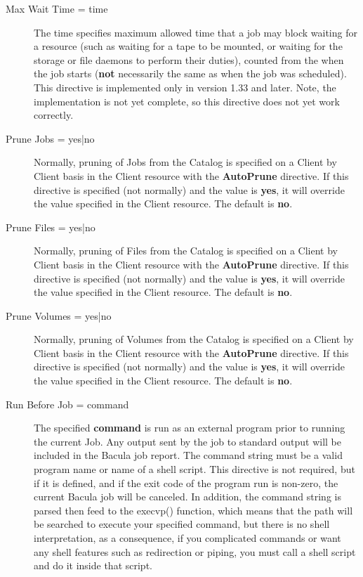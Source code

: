\begin{description}
\item [Max Wait Time = \lt{}time\gt{}]
   The time specifies  maximum allowed time that a job may block waiting for a
   resource  (such as waiting for a tape to be mounted, or waiting for the
   storage  or file daemons to perform their duties), counted from the when  the
   job starts ({\bf not} necessarily the same as when the job  was scheduled).
   This directive is implemented only in version 1.33  and later. Note, the
   implementation is not yet complete, so  this directive does not yet work
   correctly. 

\item [Prune Jobs = \lt{}yes|no\gt{}]
   Normally, pruning of Jobs  from the Catalog is specified on a Client by Client
   basis in the  Client resource with the {\bf AutoPrune} directive. If this 
   directive is specified (not normally) and the value is {\bf yes}, it  will
   override the value specified in the Client resource.  The default is {\bf no}.


\item [Prune Files = \lt{}yes|no\gt{}]
   Normally, pruning of Files  from the Catalog is specified on a Client by
Client basis in the  Client resource with the {\bf AutoPrune} directive. If
this  directive is specified (not normally) and the value is {\bf yes}, it 
will override the value specified in the Client resource.  The default is {\bf
no}. 

\item [Prune Volumes = \lt{}yes|no\gt{}]
   Normally, pruning of Volumes  from the Catalog is specified on a Client by
   Client basis in the  Client resource with the {\bf AutoPrune} directive. If
   this  directive is specified (not normally) and the value is {\bf yes}, it 
   will override the value specified in the Client resource.  The default is {\bf
   no}. 

\item [Run Before Job = \lt{}command\gt{}]
   The specified {\bf command}  is run as an external program prior to running
   the current Job. Any  output sent by the job to standard output will be
   included in the  Bacula job report. The command string must be a valid program
   name  or name of a shell script. This directive is not required, but if it is 
   defined, and if the exit code of the program run is non-zero, the  current
   Bacula job will be canceled. In addition, the command string  is parsed then
   feed to the execvp() function, which means that the  path will be searched to
   execute your specified command, but there  is no shell interpretation, as a
   consequence, if you  complicated commands or want any shell features such as
   redirection  or piping, you must call a shell script and do it inside  that
   script.  
 

\end{description}
